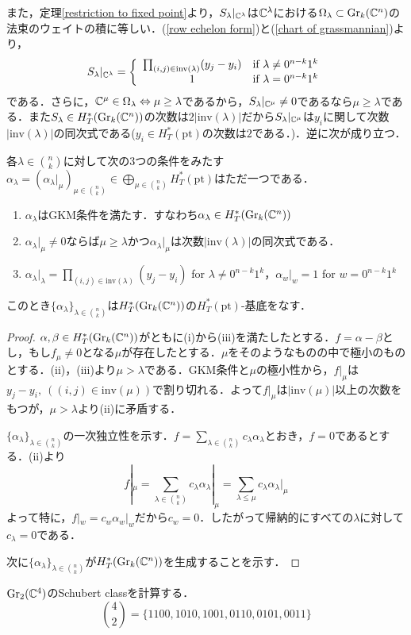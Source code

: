 また，定理\ref{restriction to fixed point}より，$S_\lambda|_{\mathbb{C}^\lambda}$は$\mathbb{C}^\lambda$における$\Omega_\lambda\subset\text{Gr}_k(\mathbb{C}^n)$の法束のウェイトの積に等しい．(\ref{row echelon form})と(\ref{chart of grassmannian})より，
\begin{equation}\label{restriction of schubert class}
S_\lambda|_{\mathbb{C}^\lambda} =\left\{\begin{array}{cc}
  \prod_{(i,j)\in\text{inv}(\lambda)}(y_j-y_i) & \text{if } \lambda\neq 0^{n-k}1^k\\
  1 & \text{if }\lambda = 0^{n-k}1^k
\end{array}\right. 
\end{equation}
である．さらに，$\mathbb{C}^\mu\in\Omega_\lambda\Leftrightarrow\mu\geq\lambda$であるから，$S_\lambda|_{\mathbb{C}^\mu}\neq0$であるなら$\mu\geq\lambda$である．また$S_\lambda\in H^*_T(\text{Gr}_k(\mathbb{C}^n))$の次数は$2|\text{inv}(\lambda)|$だから$S_\lambda|_{\mathbb{C}^\mu}$は$y_i$に関して次数$|\text{inv}(\lambda)|$の同次式である($y_i\in H^*_T(\text{pt})$の次数は$2$である．)．逆に次が成り立つ．

\begin{prop}
  各$\lambda\in\binom{n}{k}$に対して次の3つの条件をみたす$\alpha_\lambda=(\alpha_\lambda|_\mu)_{\mu\in\binom{n}{k}}\in\bigoplus_{\mu\in\binom{n}{k}}H^*_T(\text{pt})$はただ一つである．
  \begin{enumerate}
    \item $\alpha_\lambda$はGKM条件を満たす．すなわち$\alpha_\lambda\in H^*_T(\text{Gr}_k(\mathbb{C}^n))$
    \item $\alpha_\lambda|_\mu\neq0$ならば$\mu\geq\lambda$かつ$\alpha_\lambda|_\mu$は次数$|\text{inv}(\lambda)|$の同次式である．
    \item $\alpha_\lambda|_\lambda = \prod_{(i,j)\in\text{inv}(\lambda)}(y_j-y_i)$ for $\lambda\neq 0^{n-k}1^k$，$\alpha_{w}|_w = 1$ for $w = 0^{n-k}1^k$
  \end{enumerate}
  このとき$\{\alpha_\lambda\}_{\lambda\in\binom{n}{k}}$は$H^*_T(\text{Gr}_k(\mathbb{C}^n))$の$H^*_T(\text{pt})$-基底をなす．
\end{prop}

\begin{proof}
  $\alpha,\beta\in H^*_T(\text{Gr}_k(\mathbb{C}^n))$がともに(i)から(iii)を満たしたとする．$f=\alpha-\beta$とし，もし$f_\mu\neq 0$となる$\mu$が存在したとする．$\mu$をそのようなものの中で極小のものとする．(ii)，(iii)より$\mu > \lambda$である．GKM条件と$\mu$の極小性から，$f|_\mu$は$y_j - y_i,\:((i,j)\in\text{inv}(\mu))$で割り切れる．よって$f|_\mu$は$|\text{inv}(\mu)|$以上の次数をもつが，$\mu > \lambda$より(ii)に矛盾する．

  $\{\alpha_\lambda\}_{\lambda\in\binom{n}{k}}$の一次独立性を示す．$f=\sum_{\lambda\in\binom{n}{k}}c_\lambda\alpha_\lambda$とおき，$f=0$であるとする．(ii)より
  \[
  f|_\mu
  =\sum_{\lambda\in\binom{n}{k}}c_\lambda\alpha_\lambda|_\mu
  =\sum_{\lambda \leq \mu}c_\lambda\alpha_\lambda|_\mu
  \]
  よって特に，$f|_w=c_w\alpha_w|_w$だから$c_w = 0$．したがって帰納的にすべての$\lambda$に対して$c_\lambda = 0$である．

  次に$\{\alpha_\lambda\}_{\lambda\in\binom{n}{k}}$が$H^*_T(\text{Gr}_k(\mathbb{C}^n))$を生成することを示す．
\end{proof}

\begin{eg}
  $\text{Gr}_2(\mathbb{C}^4)$のSchubert classを計算する．
  \[
  \binom{4}{2} = \{1100,1010,1001,0110,0101,0011\}
  \]

\end{eg}